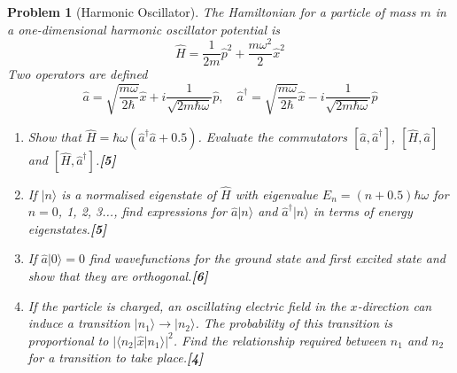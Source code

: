 \documentclass[a4paper]{article}
\theoremstyle{new}
\newtheorem{qns}{Problem}[subsection]
\begin{document}
\newpage
\begin{qns}[Harmonic Oscillator]
The Hamiltonian for a particle of mass $m$ in a one-dimensional harmonic oscillator potential is
$$\hat{H}=\frac{1}{2m}\hat{p}^2+\frac{m\omega^2}{2}\hat{x}^2$$
Two operators are defined
$$\hat{a}=\sqrt{\frac{m\omega}{2\hbar}}\hat{x}+i\frac{1}{\sqrt{2m\hbar\omega}}\hat{p},\quad \hat{a}^\dag=\sqrt{\frac{m\omega}{2\hbar}}\hat{x}-i\frac{1}{\sqrt{2m\hbar\omega}}\hat{p}$$
\begin{enumerate}[label=(\alph*)]
\item Show that $\hat{H}=\hbar\omega(\hat{a}^\dag\hat{a}+0.5)$. Evaluate the commutators $[\hat{a},\hat{a}^\dag]$, $[\hat{H},\hat{a}]$ and $[\hat{H},\hat{a}^\dag]$.\hfill\textbf{[5]}
\item If $|n\rangle$ is a normalised eigenstate of $\hat{H}$ with eigenvalue $E_n=(n+0.5)\hbar\omega$ for 
$n = 0$, 1, 2, 3..., find expressions for $\hat{a}|n\rangle$ and $\hat{a}^\dag|n\rangle$ in terms of energy eigenstates.\hfill\textbf{[5]}
\item If $\hat{a}|0\rangle=0$ find wavefunctions for the ground state and first excited state and show that they are orthogonal.\hfill\textbf{[6]}
\item If the particle is charged, an oscillating electric field in the $x$-direction can induce a transition $|n_1\rangle\rightarrow|n_2\rangle$. The probability of this transition is proportional to $|\langle n_2|\hat{x}|n_1\rangle|^2$. Find the relationship required between $n_1$ and $n_2$ for a transition to take place.\hfill\textbf{[4]}
\end{enumerate}
\end{qns}
\end{document}
